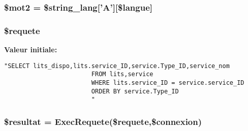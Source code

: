 \hypertarget{synoptique__home_8php_a3}{
\subsubsection[\$mot2]{\setlength{\rightskip}{0pt plus 5cm}\$mot2 = \$string\_\-lang\mbox{[}'A'\mbox{]}\mbox{[}\$langue\mbox{]}}}
\label{synoptique__home_8php_a3}


\hypertarget{synoptique__home_8php_a6}{
\subsubsection[\$requete]{\setlength{\rightskip}{0pt plus 5cm}\$requete}}
\label{synoptique__home_8php_a6}


{\bf Valeur initiale:}

\footnotesize\begin{verbatim}"SELECT lits_dispo,lits.service_ID,service.Type_ID,service_nom
                        FROM lits,service
                        WHERE lits.service_ID = service.service_ID
                        ORDER BY service.Type_ID
                        "
\end{verbatim}\normalsize 
\hypertarget{synoptique__home_8php_a7}{
\subsubsection[\$resultat]{\setlength{\rightskip}{0pt plus 5cm}\$resultat = Exec\-Requete(\$requete,\$connexion)}}
\label{synoptique__home_8php_a7}



